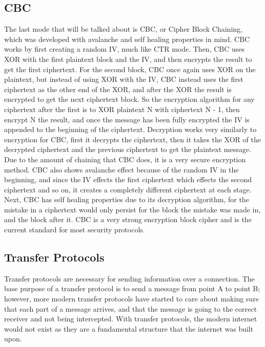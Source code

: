 \documentclass[a4paper, 10pt, draftclsnofoot, onecolumn]{article}
\begin{document}
\subsection*{CBC}
The last mode that will be talked about is CBC, or Cipher Block Chaining, which was developed with avalanche and self healing properties in mind\cite{ciphers}. CBC works by first creating a random IV, much like CTR mode. Then, CBC uses XOR with the first plaintext block and the IV, and then encrypts the result to get the first ciphertext\cite{ciphers}. For the second block, CBC once again uses XOR on the plaintext, but instead of using XOR with the IV, CBC instead uses the first ciphertext as the other end of the XOR, and after the XOR the result is encrypted to get the next ciphertext block\cite{ciphers}. So the encryption algorithm for any ciphertext after the first is to XOR plaintext N with ciphertext N - 1, then encrypt N the result, and once the message has been fully encrypted the IV is appended to the beginning of the ciphertext\cite{ciphers}. Decryption works very similarly to encryption for CBC, first it decrypts the ciphertext, then it takes the XOR of the decrypted ciphertext and the previous ciphertext to get the plaintext message\cite{ciphers}. Due to the amount of chaining that CBC does, it is a very secure encryption method. CBC also shows avalanche effect because of the random IV in the beginning, and since the IV effects the first ciphertext which effects the second ciphertext and so on, it creates a completely different ciphertext at each stage. Next, CBC has self healing properties due to its decryption algorithm, for the mistake in a ciphertext would only persist for the block the mistake was made in, and the block after it. CBC is a very strong encryption block cipher and is the current standard for most security protocols.

\begin{center}
\section*{Transfer Protocols}
\end{center}
Transfer protocols are necessary for sending information over a connection. The base purpose of a transfer protocol is to send a message from point A to point B; however, more modern transfer protocols have started to care about making sure that each part of a message arrives, and that the message is going to the correct receiver and not being intercepted. With transfer protocols, the modern internet would not exist as they are a fundamental structure that the internet was built upon. \\
\end{document}
